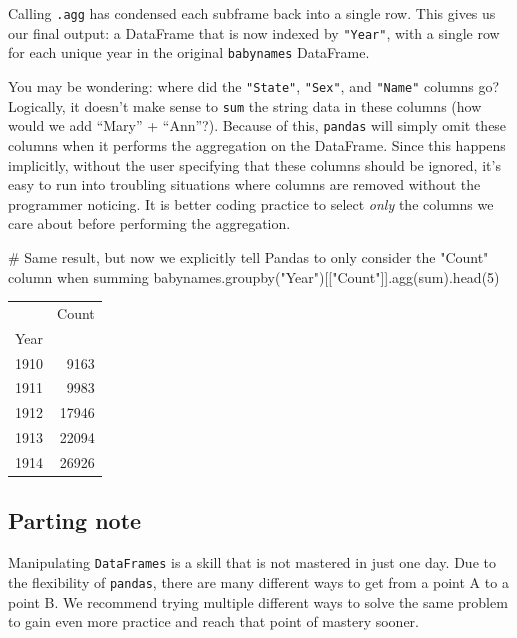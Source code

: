 \documentclass[
  letterpaper,
  DIV=11,
  numbers=noendperiod]{scrreprt}
\newenvironment{Shaded}{\begin{snugshade}}{\end{snugshade}}
\newcommand{\BuiltInTok}[1]{\textcolor[rgb]{0.00,0.23,0.31}{#1}}
\newcommand{\CommentTok}[1]{\textcolor[rgb]{0.37,0.37,0.37}{#1}}
\newcommand{\DecValTok}[1]{\textcolor[rgb]{0.68,0.00,0.00}{#1}}
\newcommand{\NormalTok}[1]{\textcolor[rgb]{0.00,0.23,0.31}{#1}}
\newcommand{\StringTok}[1]{\textcolor[rgb]{0.13,0.47,0.30}{#1}}
\begin{document}
Calling \texttt{.agg} has condensed each subframe back into a single
row. This gives us our final output: a DataFrame that is now indexed by
\texttt{"Year"}, with a single row for each unique year in the original
\texttt{babynames} DataFrame.

You may be wondering: where did the \texttt{"State"}, \texttt{"Sex"},
and \texttt{"Name"} columns go? Logically, it doesn't make sense to
\texttt{sum} the string data in these columns (how would we add ``Mary''
+ ``Ann''?). Because of this, \texttt{pandas} will simply omit these
columns when it performs the aggregation on the DataFrame. Since this
happens implicitly, without the user specifying that these columns
should be ignored, it's easy to run into troubling situations where
columns are removed without the programmer noticing. It is better coding
practice to select \emph{only} the columns we care about before
performing the aggregation.

\begin{Shaded}
\begin{Highlighting}[]
\CommentTok{\# Same result, but now we explicitly tell Pandas to only consider the "Count" column when summing}
\NormalTok{babynames.groupby(}\StringTok{"Year"}\NormalTok{)[[}\StringTok{"Count"}\NormalTok{]].agg(}\BuiltInTok{sum}\NormalTok{).head(}\DecValTok{5}\NormalTok{)}
\end{Highlighting}
\end{Shaded}

\begin{tabular}{lr}
\toprule
{} &  Count \\
Year &        \\
\midrule
1910 &   9163 \\
1911 &   9983 \\
1912 &  17946 \\
1913 &  22094 \\
1914 &  26926 \\
\bottomrule
\end{tabular}

\hypertarget{parting-note-1}{%
\subsection{Parting note}\label{parting-note-1}}

Manipulating \texttt{DataFrames} is a skill that is not mastered in just
one day. Due to the flexibility of \texttt{pandas}, there are many
different ways to get from a point A to a point B. We recommend trying
multiple different ways to solve the same problem to gain even more
practice and reach that point of mastery sooner.
\end{document}
